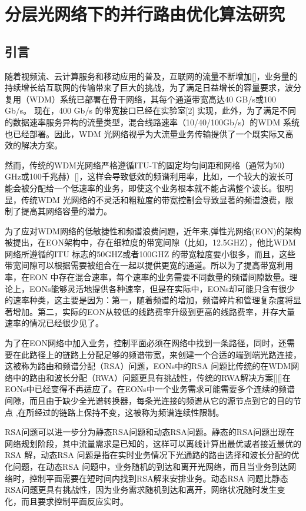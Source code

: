 
\chapter{分层光网络下的并行路由优化算法研究}
\section{引言}
随着视频流、云计算服务和移动应用的普及，互联网的流量不断增加[]，业务量的持续增长给互联网的传输带来了巨大的挑战，为了满足日益增长的容量要求，波分复用（WDM）系统已部署在骨干网络，其每个通道带宽高达40 GB/s或100 Gb/s。 现在，400 Gb/s 的带宽接口已经在实验室[2] 实现，此外，为了满足不同的数据速率服务异构的流量类型，混合线路速率（10/40/100Gb/s）的WDM 系统也已经部署。因此，WDM 光网络视乎为大流量业务传输提供了一个既实际又高效的解决方案。
  
然而，传统的WDM光网络严格遵循ITU-T的固定均匀间距和网格（通常为50）GHz或100千兆赫）[]，这样会导致低效的频谱利用率，比如，一个较大的波长可能会被分配给一个低速率的业务，即使这个业务根本就不能占满整个波长。很明显，传统WDM 光网络的不灵活和粗粒度的带宽控制会导致显著的频谱浪费，限制了提高其网络容量的潜力。

为了应对WDM网络的低敏捷性和频谱浪费问题，近年来,弹性光网络(EON)的架构被提出，在EON架构中，存在细粒度的带宽间隙（比如，12.5GHZ），他比WDM 网络所遵循的ITU 标志的50GHZ或者100GHZ 的带宽粒度要小很多，而且，这些带宽间隙可以根据需要被组合在一起以提供更宽的通道。所以为了提高带宽利用率，在EON 中存在混合速率，每个速率的业务需要不同数量的频谱间隙数量。理论上，EONs能够灵活地提供各种速率，但是在实际中，EONs却可能只含有很少的速率种类，这主要是因为：第一，随着频谱的增加，频谱碎片和管理复杂度将显著增加。第二，实际的EON从较低的线路费率升级到更高的线路费率，并存大量速率的情况已经很少见了。

为了在EON网络中加入业务，控制平面必须在网络中找到一条路径，同时，还需要在此路径上的链路上分配足够的频谱带宽，来创建一个合适的端到端光路连接，这被称为路由和频谱分配（RSA）问题，EONs中的RSA 问题比传统的在WDM网络中的路由和波长分配（RWA）问题更具有挑战性，传统的RWA解决方案[][]在EONs中已经变得不再适应了。在EONs中一个业务需求可能需要多个连续的频谱间隙，而且由于缺少全光谱转换器，每条光连接的频谱从它的源节点到它的目的节点 ,在所经过的链路上保持不变，这被称为频谱连续性限制。

RSA问题可以进一步分为静态RSA问题和动态RSA问题。静态的RSA问题出现在网络规划阶段，其中流量需求是已知的，这样可以离线计算出最优或者接近最优的RSA 解，动态RSA 问题是指在实时业务情况下光通路的路由选择和波长分配的优化问题，在动态RSA 问题中，业务随机的到达和离开光网络，而且当业务到达网络时，控制平面需要在短时间内找到RSA解来安排业务。动态RSA 问题比静态RSA问题更具有挑战性，因为业务需求随机到达和离开，网络状况随时发生变化，而且要求控制平面反应实时。


